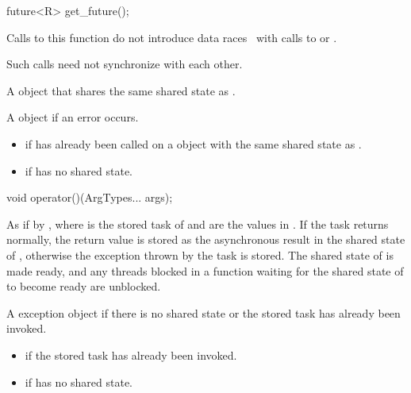 %
\begin{itemdecl}
future<R> get_future();
\end{itemdecl}

\begin{itemdescr}
\pnum
\sync
Calls to this function do not introduce
data races~ with calls to
 or
.
\begin{note}
Such calls need not synchronize with each other.
\end{note}

\pnum
\returns
A  object that shares the same shared state as .

\pnum
\throws
A  object if an error occurs.

\pnum
\errors
\begin{itemize}
\item {} if  has already been called on
a  object with the same shared state as .
\item {} if  has no shared state.
\end{itemize}
\end{itemdescr}

%
\begin{itemdecl}
void operator()(ArgTypes... args);
\end{itemdecl}

\begin{itemdescr}
\pnum
\effects
As if by ,
where  is the
stored task of  and
 are the values in . If the task returns normally,
the return value is stored as the asynchronous result in the shared state of
, otherwise the exception thrown by the task is stored. The
shared state of  is made ready, and any threads blocked in a
function waiting for
the shared state of  to become ready are unblocked.

\pnum
\throws
A  exception object if there is no shared
state or the stored task has already been invoked.

\pnum
\errors
\begin{itemize}
\item {} if
the stored task has already been invoked.
\item {} if  has no shared state.
\end{itemize}
\end{itemdescr}

